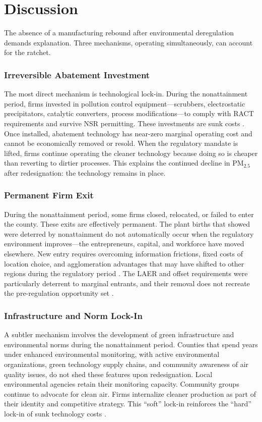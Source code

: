 \documentclass[12pt]{article}
\begin{document}



\section{Discussion}
\label{sec:discussion}

The absence of a manufacturing rebound after environmental deregulation demands explanation. Three mechanisms, operating simultaneously, can account for the ratchet.

\subsubsection*{Irreversible Abatement Investment} The most direct mechanism is technological lock-in. During the nonattainment period, firms invested in pollution control equipment---scrubbers, electrostatic precipitators, catalytic converters, process modifications---to comply with RACT requirements and survive NSR permitting. These investments are sunk costs \citep{Ryan2012}. Once installed, abatement technology has near-zero marginal operating cost and cannot be economically removed or resold. When the regulatory mandate is lifted, firms continue operating the cleaner technology because doing so is cheaper than reverting to dirtier processes. This explains the continued decline in PM$_{2.5}$ after redesignation: the technology remains in place.

\subsubsection*{Permanent Firm Exit} During the nonattainment period, some firms closed, relocated, or failed to enter the county. These exits are effectively permanent. The plant births that \citet{List2003} showed were deterred by nonattainment do not automatically occur when the regulatory environment improves---the entrepreneurs, capital, and workforce have moved elsewhere. New entry requires overcoming information frictions, fixed costs of location choice, and agglomeration advantages that may have shifted to other regions during the regulatory period \citep{KlineMoretti2014}. The LAER and offset requirements were particularly deterrent to marginal entrants, and their removal does not recreate the pre-regulation opportunity set \citep{Bartik1991, Levinson1996}.

\subsubsection*{Infrastructure and Norm Lock-In} A subtler mechanism involves the development of green infrastructure and environmental norms during the nonattainment period. Counties that spend years under enhanced environmental monitoring, with active environmental organizations, green technology supply chains, and community awareness of air quality issues, do not shed these features upon redesignation. Local environmental agencies retain their monitoring capacity. Community groups continue to advocate for clean air. Firms internalize cleaner production as part of their identity and competitive strategy. This ``soft'' lock-in reinforces the ``hard'' lock-in of sunk technology costs \citep{Deschenes2017}.
\end{document}
